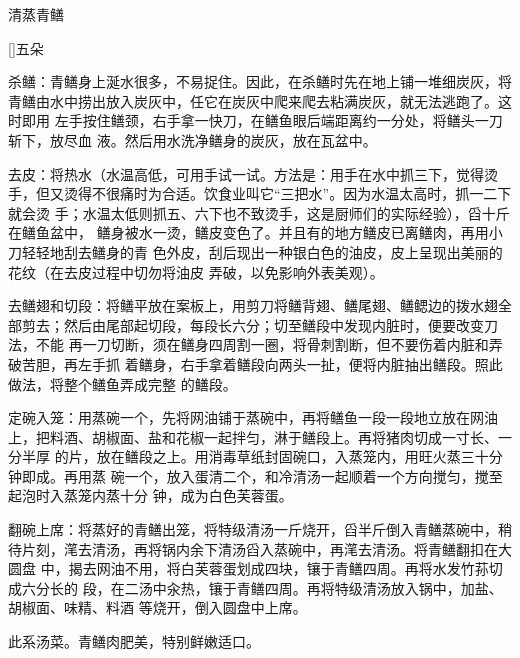 \begin{recipe}{清蒸青鳝}

\ingredients

[\footnotemark]{五朵}

\preparation

\step 杀鳝：青鳝身上涎水很多，不易捉住。因此，在杀鳝时先在地上铺一堆细炭灰，将
青鳝由水中捞出放入炭灰中，任它在炭灰中爬来爬去粘满炭灰，就无法逃跑了。这时即用
左手按住鳝颈，右手拿一快刀，在鳝鱼眼后端距离约一分处，将鳝头一刀斩下，放尽血
液。然后用水洗净鳝身的炭灰，放在瓦盆中。

\step 去皮：将热水（水温高低，可用手试一试。方法是：用手在水中抓三下，觉得烫
手，但又烫得不很痛时为合适。饮食业叫它“三把水”。因为水温太高时，抓一二下就会烫
手；水温太低则抓五、六下也不致烫手，这是厨师们的实际经验），舀十斤在鳝鱼盆中，
鳝身被水一烫，鳝皮变色了。并且有的地方鳝皮已离鳝肉，再用小刀轻轻地刮去鳝身的青
色外皮，刮后现出一种银白色的油皮，皮上呈现出美丽的花纹（在去皮过程中切勿将油皮
弄破，以免影响外表美观）。

\step 去鳝翅和切段：将鳝平放在案板上，用剪刀将鳝背翅、鳝尾翅、鳝鳃边的拨水翅全
部剪去；然后由尾部起切段，每段长六分；切至鳝段中发现内脏时，便要改变刀法，不能
再一刀切断，须在鳝身四周割一圈，将骨刺割断，但不要伤着内脏和弄破苦胆，再左手抓
着鳝身，右手拿着鳝段向两头一扯，便将内脏抽出鳝段。照此做法，将整个鳝鱼弄成完整
的鳝段。

\step 定碗入笼：用蒸碗一个，先将网油铺于蒸碗中，再将鳝鱼一段一段地立放在网油
上，把料酒、胡椒面、盐和花椒一起拌匀，淋于鳝段上。再将猪肉切成一寸长、一分半厚
的片，放在鳝段之上。用消毒草纸封固碗口，入蒸笼内，用旺火蒸三十分钟即成。再用蒸
碗一个，放入蛋清二个，和冷清汤一起顺着一个方向搅匀，搅至起泡时入蒸笼内蒸十分
钟，成为白色芙蓉蛋。

\step 翻碗上席：将蒸好的青鳝出笼，将特级清汤一斤烧开，舀半斤倒入青鳝蒸碗中，稍
待片刻，滗去清汤，再将锅内余下清汤舀入蒸碗中，再滗去清汤。将青鳝翻扣在大圆盘
中，揭去网油不用，将白芙蓉蛋划成四块，镶于青鳝四周。再将水发竹荪切成六分长的
段，在二汤中汆热，镶于青鳝四周。再将特级清汤放入锅中，加盐、胡椒面、味精、料酒
等烧开，倒入圆盘中上席。

\features

此系汤菜。青鳝肉肥美，特别鲜嫩适口。


\end{recipe}

